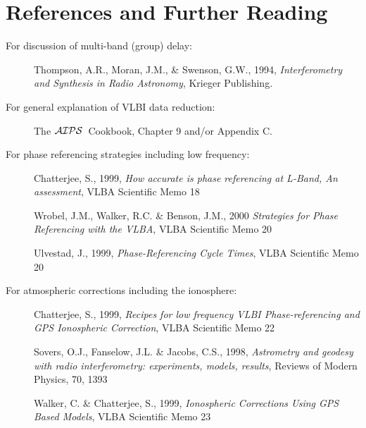 \documentclass[preprint]{aastex}
\newcommand{\AIPS}{{$\cal AIPS\/$}}
\begin{document}
\section{References and Further Reading}

\begin{description}
\item[For discussion of multi-band (group) delay:]
\item[]Thompson, A.R., Moran, J.M., \& Swenson, G.W., 1994, {\it Interferometry and
Synthesis in Radio Astronomy}, Krieger Publishing.
\end{description}
\begin{description}
\item[For general explanation of VLBI data reduction:]
\item[]The \AIPS\ Cookbook, Chapter 9 and/or Appendix C.
\end{description}
\begin{description}
\item[For phase referencing strategies including low frequency:]
\item[]Chatterjee, S., 1999, {\it How accurate is phase referencing at
L-Band, An assessment}, VLBA Scientific Memo 18
\item[]Wrobel, J.M., Walker, R.C. \& Benson, J.M., 2000 {\it Strategies for
Phase Referencing with the VLBA}, VLBA Scientific Memo 20
\item[]Ulvestad, J., 1999, {\it Phase-Referencing Cycle Times},
VLBA Scientific Memo 20
\end{description}
\begin{description}
\item[For atmospheric corrections including the ionosphere:]
\item[]Chatterjee, S., 1999, {\it Recipes for low frequency VLBI
Phase-referencing and GPS Ionospheric Correction}, VLBA Scientific Memo 22
\item[]Sovers, O.J., Fanselow, J.L. \& Jacobs, C.S., 1998, {\it Astrometry
and geodesy with radio interferometry: experiments, models, results},
Reviews of Modern Physics, 70, 1393
\item[]Walker, C. \& Chatterjee, S., 1999, {\it Ionospheric Corrections Using
GPS Based Models}, VLBA Scientific Memo 23
\end{description}
\end{document}
